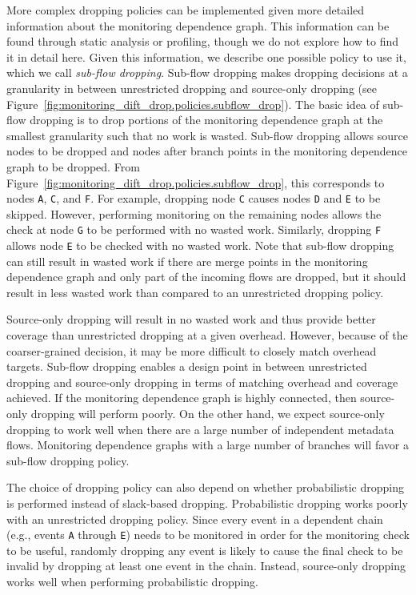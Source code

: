 More complex dropping policies can be implemented given more detailed
information about the monitoring dependence graph. This information can be
found through static analysis or profiling, though we do not explore how to
find it in detail here. Given this information, we describe one possible policy
to use it, which we call \emph{sub-flow dropping}. Sub-flow dropping makes
dropping decisions at a granularity in between unrestricted dropping and
source-only dropping (see
Figure~\ref{fig:monitoring_dift_drop.policies.subflow_drop}).  The basic idea
of sub-flow dropping is to drop portions of the monitoring dependence graph at
the smallest granularity such that no work is wasted.  Sub-flow dropping allows
source nodes to be dropped and nodes after branch points in the monitoring
dependence graph to be dropped. From
Figure~\ref{fig:monitoring_dift_drop.policies.subflow_drop}, this corresponds
to nodes {\tt A}, {\tt C}, and {\tt F}. For example, dropping node {\tt C}
causes nodes {\tt D} and {\tt E} to be skipped. However, performing monitoring
on the remaining nodes allows the check at node {\tt G} to be performed with no
wasted work.  Similarly, dropping {\tt F} allows node {\tt E} to be checked
with no wasted work.  Note that sub-flow dropping can still result in wasted
work if there are merge points in the monitoring dependence graph and only part
of the incoming flows are dropped, but it should result in less wasted work
than compared to an unrestricted dropping policy. 

Source-only dropping will result in no wasted work and thus provide better
coverage than unrestricted dropping at a given overhead.  However, because of
the
coarser-grained decision, it may be more difficult to closely match overhead
targets.  Sub-flow dropping enables a design point in between unrestricted
dropping and source-only dropping in terms of matching overhead and coverage
achieved.  If the monitoring dependence graph is highly connected, then
source-only dropping will perform poorly. On the other hand, we expect
source-only dropping to work well when there are a large number of independent
metadata flows.  Monitoring dependence graphs with a large number of branches
will favor a sub-flow dropping policy.

The choice of dropping policy can also depend on whether probabilistic dropping
is performed instead of slack-based dropping.  Probabilistic dropping works
poorly with an unrestricted dropping policy. Since every event in a dependent
chain (e.g., events {\tt A} through {\tt E}) needs to be monitored in order for
the monitoring check to be useful, randomly dropping any event is likely to
cause the final check to be invalid by dropping at least one event in the
chain. Instead, source-only dropping works well when performing probabilistic
dropping.

